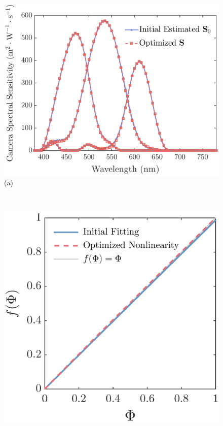 \documentclass[9pt,twocolumn,twoside]{osajnl}
\providecommand{\DIFaddbeginFL}{} %
\providecommand{\DIFaddendFL}{} %
\providecommand{\DIFdelbeginFL}{} %
\providecommand{\DIFdelendFL}{} %
\begin{document}
\begin{figure}[tbp]
	\centering
	\DIFdelbeginFL %
\DIFdelendFL \DIFaddbeginFL \begin{minipage}{0.55\linewidth}
		\DIFaddendFL \centering
		\DIFdelbeginFL %
\DIFdelendFL \DIFaddbeginFL \includegraphics[width=\linewidth]{Fig10a}\DIFaddendFL \\
		(a)
	\end{minipage}\\
	\DIFdelbeginFL %
\DIFdelendFL \DIFaddbeginFL \vspace{0.3em}
	\DIFaddendFL \begin{minipage}[b]{0.5\linewidth}
		\centering
		\DIFdelbeginFL %
\DIFdelendFL \DIFaddbeginFL \includegraphics[width=0.85\linewidth]{Fig10b}\DIFaddendFL \\

\end{minipage}
\end{figure}
\end{document}
